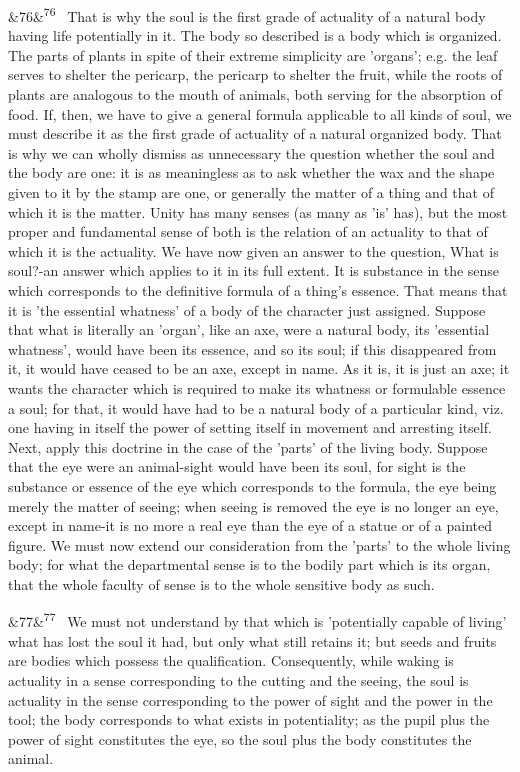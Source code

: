 \documentclass[12pt]{article}
\newcommand{\para}[1][]{\par\noindent\ifx&#1&\else\textsuperscript{\footnotesize #1}~\fi}
\begin{document}
\para[76] That is why the soul is the first grade of actuality of a natural body having life potentially in it. The body so described is a body which is organized. The parts of plants in spite of their extreme simplicity are 'organs'; e.g. the leaf serves to shelter the pericarp, the pericarp to shelter the fruit, while the roots of plants are analogous to the mouth of animals, both serving for the absorption of food. If, then, we have to give a general formula applicable to all kinds of soul, we must describe it as the first grade of actuality of a natural organized body. That is why we can wholly dismiss as unnecessary the question whether the soul and the body are one: it is as meaningless as to ask whether the wax and the shape given to it by the stamp are one, or generally the matter of a thing and that of which it is the matter. Unity has many senses (as many as 'is' has), but the most proper and fundamental sense of both is the relation of an actuality to that of which it is the actuality. We have now given an answer to the question, What is soul?-an answer which applies to it in its full extent. It is substance in the sense which corresponds to the definitive formula of a thing's essence. That means that it is 'the essential whatness' of a body of the character just assigned. Suppose that what is literally an 'organ', like an axe, were a natural body, its 'essential whatness', would have been its essence, and so its soul; if this disappeared from it, it would have ceased to be an axe, except in name. As it is, it is just an axe; it wants the character which is required to make its whatness or formulable essence a soul; for that, it would have had to be a natural body of a particular kind, viz. one having in itself the power of setting itself in movement and arresting itself. Next, apply this doctrine in the case of the 'parts' of the living body. Suppose that the eye were an animal-sight would have been its soul, for sight is the substance or essence of the eye which corresponds to the formula, the eye being merely the matter of seeing; when seeing is removed the eye is no longer an eye, except in name-it is no more a real eye than the eye of a statue or of a painted figure. We must now extend our consideration from the 'parts' to the whole living body; for what the departmental sense is to the bodily part which is its organ, that the whole faculty of sense is to the whole sensitive body as such.

\para[77] We must not understand by that which is 'potentially capable of living' what has lost the soul it had, but only what still retains it; but seeds and fruits are bodies which possess the qualification. Consequently, while waking is actuality in a sense corresponding to the cutting and the seeing, the soul is actuality in the sense corresponding to the power of sight and the power in the tool; the body corresponds to what exists in potentiality; as the pupil plus the power of sight constitutes the eye, so the soul plus the body constitutes the animal.
\end{document}
